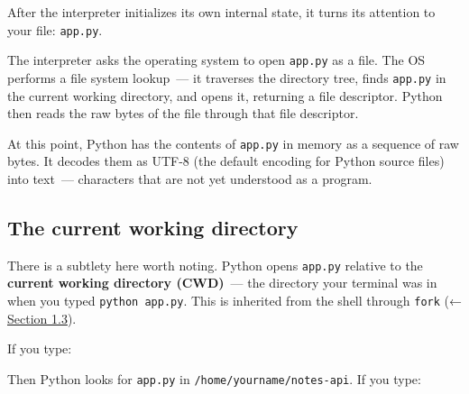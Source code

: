 After the interpreter initializes its own internal state, it turns its attention to your file: \texttt{app.py}.

The interpreter asks the operating system to open \texttt{app.py} as a file. The OS performs a file system lookup~--- it traverses the directory tree, finds \texttt{app.py} in the current working directory, and opens it, returning a file descriptor. Python then reads the raw bytes of the file through that file descriptor.

At this point, Python has the contents of \texttt{app.py} in memory as a sequence of raw bytes. It decodes them as UTF-8 (the default encoding for Python source files) into text~--- characters that are not yet understood as a program.

\subsection*{The current working directory}\label{02-runtime-initialization:the-current-working-directory}

There is a subtlety here worth noting. Python opens \texttt{app.py} relative to the \textbf{current working directory (CWD)}~--- the directory your terminal was in when you typed \texttt{python\ app.py}. This is inherited from the shell through \texttt{fork} (← \hyperref[01-command-to-process:13-how-the-operating-system-starts-a-new-program-fork-and-exec]{Section 1.3}).

If you type:

\begin{codebox}[short]

\begin{Shaded}
\begin{Highlighting}[]
\end{Highlighting}
\end{Shaded}

\end{codebox}

\noindent{}Then Python looks for \texttt{app.py} in \texttt{/}\allowbreak{}\texttt{home/}\allowbreak{}\texttt{yourname/}\allowbreak{}\texttt{notes-}\allowbreak{}\texttt{api}. If you type:

\begin{codebox}[short]

\begin{Shaded}
\begin{Highlighting}[]
\end{Highlighting}
\end{Shaded}

\end{codebox}

